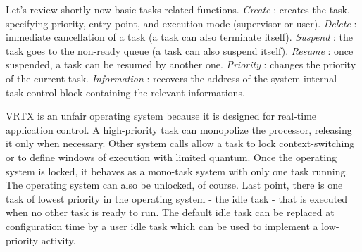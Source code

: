 \documentclass[10pt]{report}
\begin{document}
Let's review shortly now basic tasks-related functions. {\em Create} : creates the task, specifying priority, entry point,
and execution mode (supervisor or user). {\em Delete} : immediate cancellation of a
task (a task can also terminate itself). {\em Suspend} : the task goes
to the non-ready queue (a task can also suspend itself). {\em Resume} : once suspended, a task
can be resumed by another one. {\em Priority} : changes the priority of the current task. {\em Information} : recovers
the address of the system internal task-control block containing the relevant informations.

VRTX is an unfair operating system because it is designed for
real-time application control. A high-priority task can
monopolize the processor, releasing it only when necessary. 
Other system calls allow a task to lock context-switching or
to define windows of execution with limited quantum. Once the
operating system is locked, it behaves as a mono-task system with
only one task running. The operating system can also be unlocked,
of course. Last point, there is one task of lowest priority in the
operating system - the idle task - that is executed when no other
task is ready to run. The default idle task can be replaced at
configuration time by a user idle task which can be used to
implement a low-priority activity.
\end{document}
